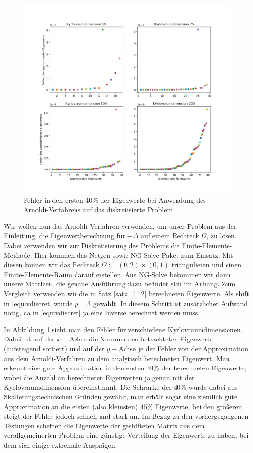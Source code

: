 \documentclass{article}
\theoremstyle{plain}
\begin{document}
\begin{figure}\label{error_eigv_laplace}
	\centering
	\includegraphics[width = 0.9\linewidth]{Plots/error_eigv_laplace}
	\caption{Fehler in den ersten 40\% der Eigenwerte bei Anwendung des Arnoldi-Verfahrens auf das diskretisierte Problem}
\end{figure}

Wir wollen nun das Arnoldi-Verfahren verwenden, um unser Problem aus der Einleitung, die Eigenwertberechnung für $-\Delta$ auf einem Rechteck $\Omega$, zu lösen. Dabei verwenden wir zur Diskretisierung des Problems die Finite-Elemente-Methode. Hier kommen das Netgen sowie NG-Solve Paket zum Einsatz. Mit diesen können wir das Rechteck $\Omega := (0,2) \times (0,1)$ triangulieren und einen Finite-Elemente-Raum darauf erstellen. Aus NG-Solve bekommen wir dann unsere Matrizen, die genaue Ausführung dazu befindet sich im Anhang. Zum Vergleich verwenden wir die in Satz \ref{satz_1_2} berechneten Eigenwerte. Als shift in \eqref{equivdiscret} wurde $\rho = 3$ gewählt. In diesem Schritt ist zusätzlicher Aufwand nötig, da in \eqref{equivdiscret} ja eine Inverse berechnet werden muss.

 In Abbildung \ref{error_eigv_laplace} sieht man den Fehler für verschiedene Kyrlovraumdimensionen. Dabei ist auf der $x-$Achse die Nummer des betrachteten Eigenwerts (aufsteigend sortiert) und auf der $y-$Achse je der Fehler von der Approximation aus dem Arnoldi-Verfahren zu dem analytisch berechneten Eigenwert.
 Man erkennt eine gute Approximation in den ersten $40\%$ der berechneten Eigenwerte, wobei die Anzahl an berechneten Eigenwerten ja genau mit der Kyrlovraumdimension übereinstimmt. Die Schranke der $40\%$ wurde dabei aus Skalierungstechnischen Gründen gewählt, man erhält sogar eine ziemlich gute Approximation an die ersten (also kleinsten) $45\%$ Eigenwerte, bei den größeren steigt der Fehler jedoch schnell und stark an. Im Bezug zu den vorhergegangenen Testungen scheinen die Eigenwerte der geshifteten Matrix aus dem verallgemeinerten Problem eine günstige Verteilung der Eigenwerte zu haben, bei dem sich einige extremale Ausprägen.
\end{document}
